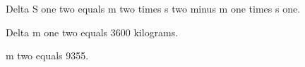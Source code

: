 Delta S one two equals m two times s two minus m one times s one.  

Delta m one two equals 3600 kilograms.  

m two equals 9355.